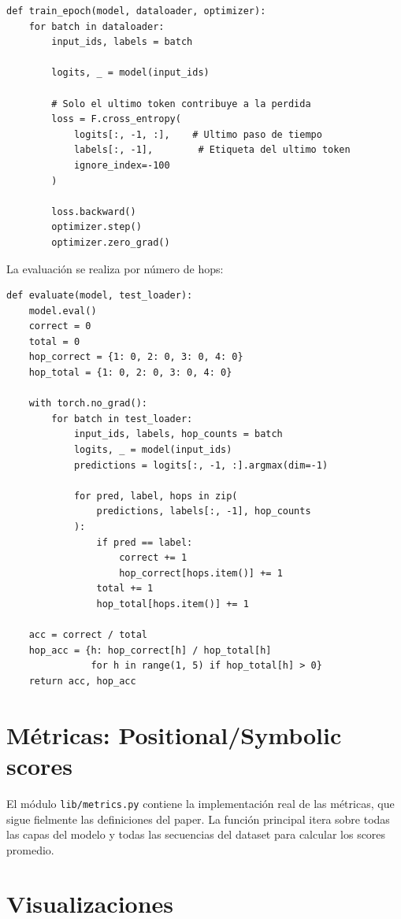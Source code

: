 \documentclass[12pt,a4paper,oneside]{report}
\begin{document}
\begin{lstlisting}
def train_epoch(model, dataloader, optimizer):
    for batch in dataloader:
        input_ids, labels = batch

        logits, _ = model(input_ids)

        # Solo el ultimo token contribuye a la perdida
        loss = F.cross_entropy(
            logits[:, -1, :],    # Ultimo paso de tiempo
            labels[:, -1],        # Etiqueta del ultimo token
            ignore_index=-100
        )

        loss.backward()
        optimizer.step()
        optimizer.zero_grad()
\end{lstlisting}

La evaluación se realiza por número de hops:

\begin{lstlisting}
def evaluate(model, test_loader):
    model.eval()
    correct = 0
    total = 0
    hop_correct = {1: 0, 2: 0, 3: 0, 4: 0}
    hop_total = {1: 0, 2: 0, 3: 0, 4: 0}

    with torch.no_grad():
        for batch in test_loader:
            input_ids, labels, hop_counts = batch
            logits, _ = model(input_ids)
            predictions = logits[:, -1, :].argmax(dim=-1)

            for pred, label, hops in zip(
                predictions, labels[:, -1], hop_counts
            ):
                if pred == label:
                    correct += 1
                    hop_correct[hops.item()] += 1
                total += 1
                hop_total[hops.item()] += 1

    acc = correct / total
    hop_acc = {h: hop_correct[h] / hop_total[h]
               for h in range(1, 5) if hop_total[h] > 0}
    return acc, hop_acc
\end{lstlisting}

\section{Métricas: Positional/Symbolic scores}

El módulo \texttt{lib/metrics.py} contiene la implementación real de las métricas, que sigue fielmente las definiciones del paper. La función principal itera sobre todas las capas del modelo y todas las secuencias del dataset para calcular los scores promedio.

\section{Visualizaciones}
\end{document}
